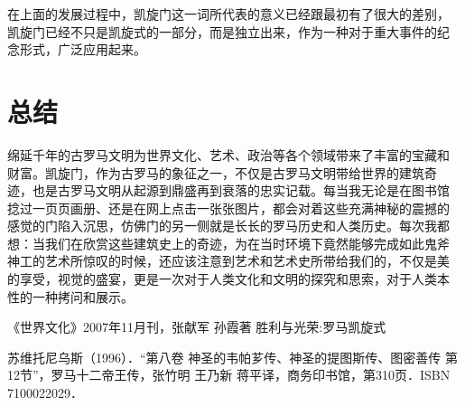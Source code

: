\documentclass[a4paper,dvipdfm]{article}
\begin{document}
在上面的发展过程中，凯旋门这一词所代表的意义已经跟最初有了很大的差别，
凯旋门已经不只是凯旋式的一部分，而是独立出来，作为一种对于重大事件的纪
念形式，广泛应用起来。

\section{总结}

绵延千年的古罗马文明为世界文化、艺术、政治等各个领域带来了丰富的宝藏和
财富。凯旋门，作为古罗马的象征之一，不仅是古罗马文明带给世界的建筑奇
迹，也是古罗马文明从起源到鼎盛再到衰落的忠实记载。每当我无论是在图书馆
捻过一页页画册、还是在网上点击一张张图片，都会对着这些充满神秘的震撼的
感觉的门陷入沉思，仿佛门的另一侧就是长长的罗马历史和人类历史。每次我都
想：当我们在欣赏这些建筑史上的奇迹，为在当时环境下竟然能够完成如此鬼斧
神工的艺术所惊叹的时候，还应该注意到艺术和艺术史所带给我们的，不仅是美
的享受，视觉的盛宴，更是一次对于人类文化和文明的探究和思索，对于人类本
性的一种拷问和展示。

\appendix{}
《世界文化》2007年11月刊，张献军 孙霞著 胜利与光荣:罗马凯旋式

苏维托尼乌斯（1996）．“第八卷 神圣的韦帕芗传、神圣的提图斯传、图密善传
第12节”，罗马十二帝王传，张竹明 王乃新 蒋平译，商务印书馆，第310页．ISBN
7100022029．



\end{document}
